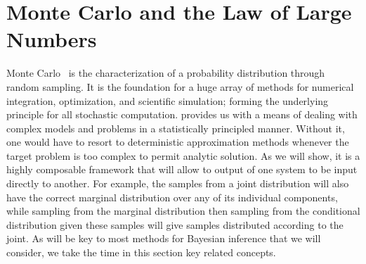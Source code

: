 
\section{Monte Carlo and the Law of Large Numbers}
\label{sec:inf:mc}

Monte Carlo~\citep{metropolis1949monte} is the characterization of a probability distribution 
through random sampling. It is the foundation for a huge array of methods for numerical 
integration, optimization, and scientific simulation; forming the underlying principle 
for all stochastic computation.
\mc provides us with a means of dealing with complex models and problems in a
statistically principled manner.  Without it, one would have to resort to deterministic
approximation methods whenever the target problem is too complex to permit analytic
solution.  As we will show, it is a highly composable framework that will allow to output
of one system to be input directly to another.  For example, the \mc samples from a joint
distribution will also have the correct marginal distribution over any of its individual components,
while sampling from the marginal distribution then sampling from the conditional distribution
given these samples will give samples distributed according to the joint.  As \mc
will be key to most methods for Bayesian inference that we will consider, we take the time
in this section key related concepts.

